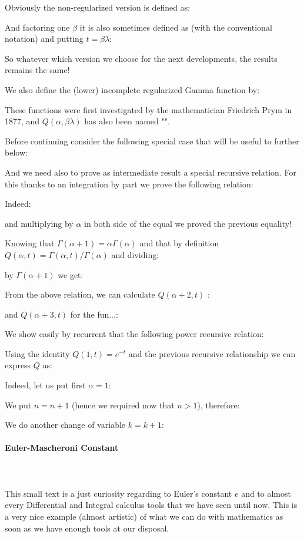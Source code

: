 	Obviously the non-regularized version is defined as:
	
	And factoring one $\beta$ it is also sometimes defined as (with the conventional notation) and putting $t=\beta\lambda$:
	
	So whatever which version we choose for the next developments, the results remains the same!
	\begin{tcolorbox}[title=Remark,colframe=black,arc=10pt]
	We also define the (lower) incomplete regularized Gamma function by:
	
	These functions were first investigated by the mathematician Friedrich Prym in 1877, and $Q(\alpha,\beta\lambda)$ has also been named "".
	\end{tcolorbox}
	Before continuing consider the following special case that will be useful to further below:
	
	And we need also to prove as intermediate result a special recursive relation. For this thanks to an integration by part we prove the following relation:
	
	Indeed:	
	
	and multiplying by $\alpha$ in both side of the equal we proved the previous equality!
	
	Knowing that $\Gamma(\alpha+1) = \alpha\Gamma(\alpha)$ and that by definition $Q(\alpha,t)=\Gamma(\alpha,t)/\Gamma(\alpha)$ and dividing:
	
	 by $\Gamma(\alpha + 1)$ we get:
	
	From the above relation, we can calculate $Q(\alpha+2,t)$ :
	
	and $Q(\alpha+3,t)$ for the fun...:
	
	We show easily by recurrent that the following power recursive relation:
	
	Using the identity $Q(1,t)=e^{-t}$ and the previous recursive relationship we can express $Q$ as:
	
	Indeed, let us put first $\alpha=1$:
	
	We put $n=n+1$ (hence we required now that $n>1$), therefore:
	
	We do another change of variable $k=k+1$:
	
	
	\pagebreak
	\paragraph{Euler-Mascheroni Constant}\mbox{}\\\\
	This small text is a just curiosity regarding to Euler's constant $e$ and to almost every Differential and Integral calculus tools that we have seen until now. This is a very nice example (almost artistic) of what we can do with mathematics as soon as we have enough tools at our disposal.
	
